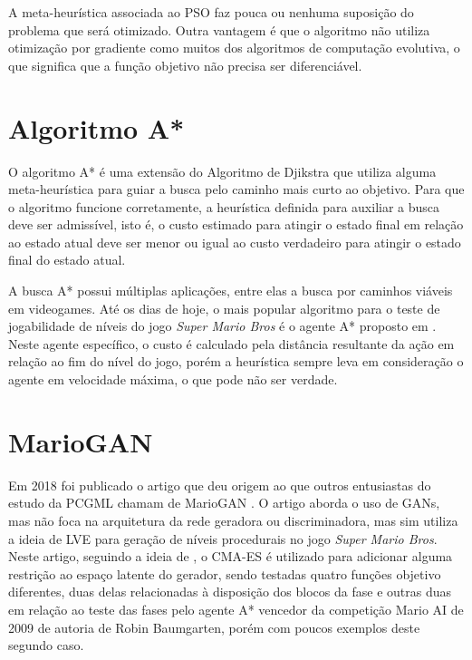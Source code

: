A meta-heurística associada ao PSO faz pouca ou nenhuma suposição do problema que será otimizado. Outra vantagem é que o algoritmo não utiliza otimização por gradiente como muitos dos algoritmos de computação evolutiva, o que significa que a função objetivo não precisa ser diferenciável. 

\section{Algoritmo A*}

O algoritmo A* é uma extensão do Algoritmo de Djikstra que utiliza alguma meta-heurística para guiar a busca pelo caminho mais curto ao objetivo. Para que o algoritmo funcione corretamente, a heurística definida para auxiliar a busca deve ser admissível, isto é, o custo estimado para atingir o estado final em relação ao estado atual deve ser menor ou igual ao custo verdadeiro para atingir o estado final do estado atual. 

A busca A* possui múltiplas aplicações, entre elas a busca por caminhos viáveis em videogames. Até os dias de hoje, o mais popular algoritmo para o teste de jogabilidade de níveis do jogo \textit{Super Mario Bros} é o agente A* proposto em \cite{marioAI}. Neste agente específico, o custo é calculado pela distância resultante da ação em relação ao fim do nível do jogo, porém a heurística sempre leva em consideração o agente em velocidade máxima, o que pode não ser verdade. 


\section{MarioGAN}

Em 2018 foi publicado o artigo que deu origem ao que outros entusiastas do estudo da PCGML chamam de MarioGAN \cite{marioGAN}. O artigo aborda o uso de GANs, mas não foca na arquitetura da rede geradora ou discriminadora, mas sim utiliza a ideia de LVE para geração de níveis procedurais no jogo \emph{Super Mario Bros}. Neste artigo, seguindo a ideia de \cite{fingerprints}, o CMA-ES é utilizado para adicionar alguma restrição ao espaço latente do gerador, sendo testadas quatro funções objetivo diferentes, duas delas relacionadas à disposição dos blocos da fase e outras duas em relação ao teste das fases pelo agente A* vencedor da competição Mario AI de 2009 \cite{marioAI} de autoria de Robin Baumgarten, porém com poucos exemplos deste segundo caso.

